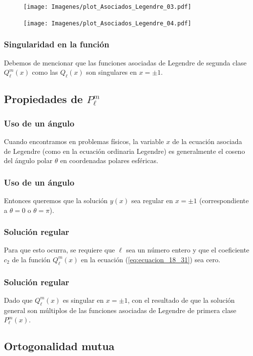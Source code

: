 \documentclass[12pt]{beamer}
\begin{document}
\begin{frame}[plain]
\begin{figure}
    \centering
    \texttt{[image: Imagenes/plot\_Asociados\_Legendre\_03.pdf]}
\end{figure}
\end{frame}
\begin{frame}[plain]
\begin{figure}
    \centering
    \texttt{[image: Imagenes/plot\_Asociados\_Legendre\_04.pdf]}
\end{figure}
\end{frame}
\begin{frame}
\frametitle{Singularidad en la función}
Debemos de mencionar que las funciones asociadas de Legendre de segunda clase $Q_{\ell}^{m} (x)$ como las $Q_{\ell}(x)$ son singulares en $x= \pm 1$.
\end{frame}

\subsection{Propiedades de \texorpdfstring{$P_{\ell}^{m}$}{P l m}}

\begin{frame}
\frametitle{Uso de un ángulo}
Cuando encontramos en problemas físicos, la variable $x$ de la ecuación asociada de Legendre (como en la ecuación ordinaria Legendre) es generalmente el coseno del ángulo polar $\theta$ en coordenadas polares esféricas.
\end{frame}
\begin{frame}
\frametitle{Uso de un ángulo}
Entonces queremos que la solución $y (x)$ sea regular en $x = \pm 1$ (correspondiente a $\theta = 0$ o $\theta = \pi$).
\end{frame}
\begin{frame}
\frametitle{Solución regular}
Para que esto ocurra, \pause se requiere que $\ell$ sea un número entero y que el coeficiente $c_{2}$ de la función $Q_{\ell}^{m} (x)$ en la ecuación (\ref{eq:ecuacion_18_31}) sea cero.
\end{frame}
\begin{frame}
\frametitle{Solución regular}
Dado que $Q_{\ell}^{m}(x)$ es singular en $x = \pm 1$, \pause con el resultado de que la solución general son múltiplos de las funciones asociadas de Legendre de primera clase $P_{\ell}^{m}(x)$.
\end{frame}

\subsection{Ortogonalidad mutua}
\end{document}
